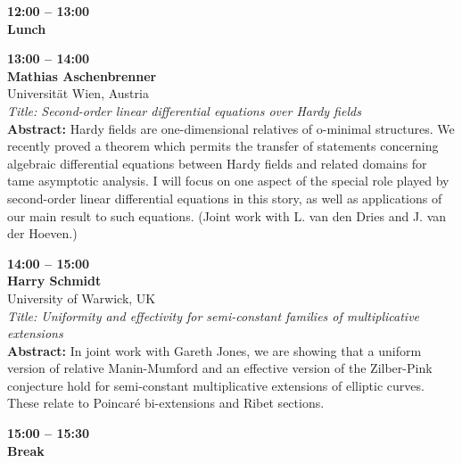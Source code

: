 \documentclass[10pt,a4paper]{article}
\begin{document}
\begin{tcolorbox}[talkbox]
\textbf{12:00 -- 13:00} \\
\textbf{Lunch}
\end{tcolorbox}
\begin{tcolorbox}[talkbox]
\textbf{13:00 -- 14:00} \\
\textbf{Mathias Aschenbrenner} \\
Universität Wien, Austria \\
\textit{Title: Second-order linear differential equations over Hardy fields} \\
\textbf{Abstract:} Hardy fields are one-dimensional relatives of o-minimal structures. We recently proved a theorem which permits the transfer of statements concerning algebraic differential equations between Hardy fields and related domains for tame asymptotic analysis. I will focus on one aspect of the special role played by second-order linear differential equations in this story, as well as applications of our main result to such equations. (Joint work with L. van den Dries and J. van der Hoeven.)
\end{tcolorbox}
\begin{tcolorbox}[talkbox]
\textbf{14:00 -- 15:00} \\
\textbf{Harry Schmidt} \\
University of Warwick, UK \\
\textit{Title: Uniformity and effectivity for semi-constant families of multiplicative extensions} \\
\textbf{Abstract:} In joint work with Gareth Jones, we are showing that a uniform version of relative Manin-Mumford and an effective version of the Zilber-Pink conjecture hold for semi-constant multiplicative extensions of elliptic curves. These relate to Poincaré bi-extensions and Ribet sections.
\end{tcolorbox}
\begin{tcolorbox}[talkbox]
\textbf{15:00 -- 15:30} \\
\textbf{Break}
\end{tcolorbox}
\end{document}
